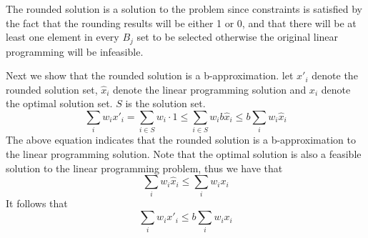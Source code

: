 \begin{exercise}[]
\begin{solution}
  The rounded solution is a solution to the problem since constraints is satisfied by the fact that the rounding results will be either 1 or 0, and that there will be at least one element in every $B_j$ set to be selected otherwise the original linear programming will be infeasible.

  Next we show that the rounded solution is a b-approximation. let $x'_i$ denote the rounded solution set, $\hat{x}_i$ denote the linear programming solution and $x_i$ denote the optimal solution set. $S$ is the solution set.
  \begin{equation}
    \sum_{i} w_i x'_{i} =  \sum_{i \in S} w_i \cdot 1 \le \sum_{i \in S} w_i b\hat{x}_{i} \le b \sum_{i}w_i \hat{x}_{i}
  \end{equation}
  The above equation indicates that the rounded solution is a b-approximation to the linear programming solution. Note that the optimal solution is also a feasible solution to the linear programming problem, thus we have that
  \begin{equation}
    \sum_{i}w_i \hat{x}_{i} \le \sum_{i}w_i x_{i} 
  \end{equation}
  It follows that 
  \begin{equation}
    \sum_{i} w_i x'_{i} \le b \sum_{i}w_i x_{i} 
  \end{equation}
  \end{solution}
  \label{ex2}
\end{exercise}



